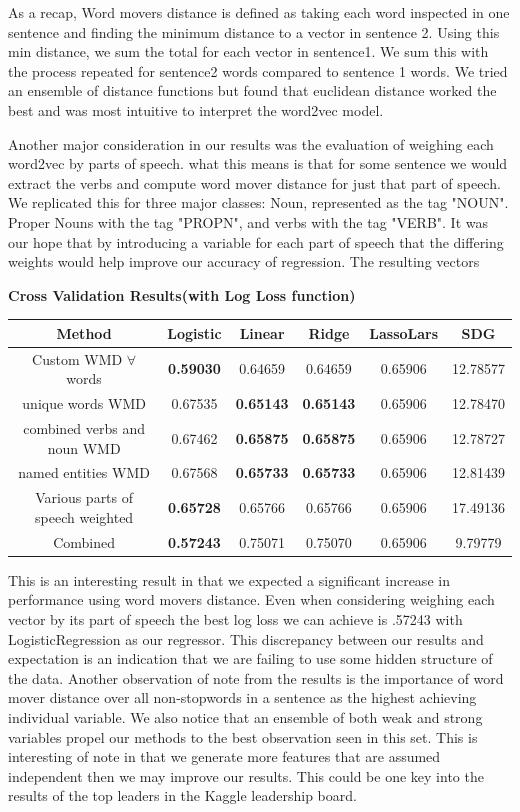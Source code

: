 \documentclass{article} %
\begin{document}
As a recap, Word movers distance is defined as taking each word inspected in one sentence and finding the minimum distance to a vector in sentence 2. Using this min distance, we sum the total for each vector in sentence1. We sum this with the process repeated for sentence2 words compared to sentence 1 words. 
 We tried an ensemble of distance functions but found that euclidean distance worked the best and was most intuitive to interpret the word2vec model. 

Another major consideration in our results was the evaluation of weighing each word2vec by parts of speech. what this means is that for some sentence we would extract the verbs and compute word mover distance for just that part of speech. We replicated this for three major classes: Noun, represented as the tag "NOUN". Proper Nouns with the tag "PROPN", and verbs with the tag "VERB". 
It was our hope that by introducing a variable for each part of speech that the differing weights would help improve our accuracy of regression. The resulting vectors

\begin{center}
\textbf{Cross Validation Results(with Log Loss function)}

	\begin{tabular}{|c|c|c|c|c|c|} \hline
	Method & Logistic & Linear & Ridge & LassoLars & SDG \\ \hline
	Custom WMD $\forall$ words & \textbf{0.59030} & 0.64659 & 0.64659 & 0.65906 & 12.78577 \\ \hline
	unique words WMD & 0.67535 & \textbf{0.65143} & \textbf{0.65143} & 0.65906 & 12.78470 \\ \hline
	combined verbs and noun WMD & 0.67462 & \textbf{0.65875} & \textbf{0.65875} & 0.65906 & 12.78727 \\ \hline
	named entities WMD & 0.67568 & \textbf{0.65733} & \textbf{0.65733} & 0.65906 & 12.81439 \\ \hline
	Various parts of speech weighted & \textbf{0.65728} & 0.65766 & 0.65766 & 0.65906 & 17.49136\\ \hline
	Combined & \textbf{0.57243} & 0.75071 & 0.75070 & 0.65906 & 9.79779 \\ \hline
	\end{tabular}
\end{center}
This is an interesting result in that we expected a significant increase in performance using word movers distance. Even when considering weighing each vector by its part of speech the best log loss we can achieve is .57243 with LogisticRegression as our regressor. This discrepancy between our results and expectation is an indication that we are failing to use some hidden structure of the data. Another observation of note from the results is the importance of word mover distance over all non-stopwords in a sentence as the highest achieving individual variable. We also notice that an ensemble of both weak and strong variables propel our methods to the best observation seen in this set. This is interesting of note in that we generate more features that are assumed independent then we may improve our results. This could be one key into the results of the top leaders in the Kaggle leadership board.
\end{document}
